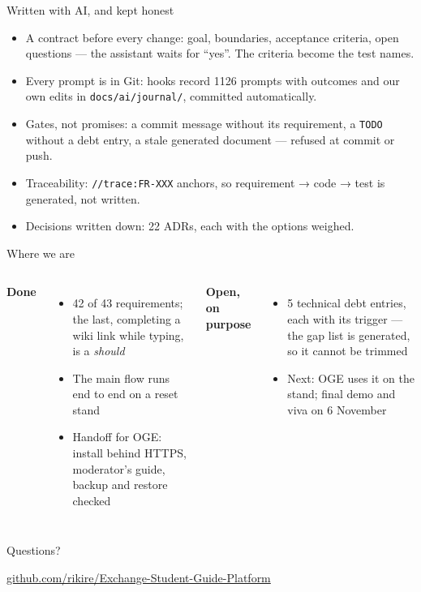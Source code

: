 \documentclass[aspectratio=169,11pt]{beamer}
\begin{document}
\begin{frame}{Written with AI, and kept honest}
\small
\begin{itemize}
\item \alert{A contract before every change}: goal, boundaries, acceptance criteria, open questions
  --- the assistant waits for ``yes''. The criteria become the test names.
\item \alert{Every prompt is in Git}: hooks record 1126 prompts with outcomes and our own edits in
  \texttt{docs/ai/journal/}, committed automatically.
\item \alert{Gates, not promises}: a commit message without its requirement, a \texttt{TODO}
  without a debt entry, a stale generated document --- refused at commit or push.
\item \alert{Traceability}: \texttt{//trace:FR-XXX} anchors, so requirement → code → test is
  generated, not written.
\item \alert{Decisions written down}: 22 ADRs, each with the options weighed.
\end{itemize}
\end{frame}

\begin{frame}{Where we are}
\begin{columns}[T]
\small
\textbf{Done}
\begin{itemize}
\item 42 of 43 requirements; the last, completing a wiki link while typing, is a \emph{should}
\item The main flow runs end to end on a reset stand
\item Handoff for OGE: install behind HTTPS, moderator's guide, backup and restore checked
\end{itemize}
\small
\textbf{Open, on purpose}
\begin{itemize}
\item 5 technical debt entries, each with its trigger --- the gap list is generated, so it cannot
  be trimmed
\item Next: OGE uses it on the stand; final demo and viva on 6 November
\end{itemize}
\end{columns}
\end{frame}

\begin{frame}[standout]
Questions?

\vspace{0.6em}
{\normalsize\url{github.com/rikire/Exchange-Student-Guide-Platform}}
\end{frame}
\end{document}
